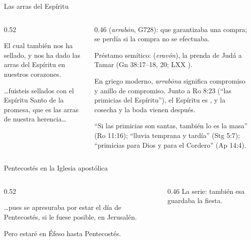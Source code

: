 \begin{frame}{Las arras del Espíritu}
\begin{columns}[c,onlytextwidth]
\begin{column}{0.52\textwidth}
\begin{cita}El cual también nos ha sellado, y nos ha dado las arras del Espíritu en nuestros corazones.\end{cita}
\begin{cita}\ldots{}fuisteis sellados con el Espíritu Santo de la promesa, que es las arras de nuestra herencia\ldots{}\end{cita}
\end{column}
\begin{column}{0.46\textwidth}\small\RaggedRight
{} (\emph{arrabōn}, G728):  que garantizaba una compra; se perdía si la compra no se efectuaba.\par\smallskip
Préstamo semítico:  (\emph{eravón}), la prenda de Judá a Tamar (Gn 38:17--18, 20; LXX ).\par\smallskip
En griego moderno, \emph{arrabōna} significa compromiso y anillo de compromiso. Junto a Ro 8:23 (``las primicias del Espíritu''), el Espíritu es , y la cosecha y la boda vienen después.\par\smallskip\scriptsize ``Si las primicias son santas, también lo es la masa'' (Ro 11:16); ``lluvia temprana y tardía'' (Stg 5:7); ``primicias para Dios y para el Cordero'' (Ap 14:4).
\end{column}
\end{columns}
\end{frame}

\begin{frame}{Pentecostés en la Iglesia apostólica}
\begin{columns}[c,onlytextwidth]
\begin{column}{0.52\textwidth}
\begin{cita}\ldots{}pues se apresuraba por estar el día de Pentecostés, si le fuese posible, en Jerusalén.\end{cita}
\begin{cita}Pero estaré en Éfeso hasta Pentecostés.\end{cita}
\end{column}
\begin{column}{0.46\textwidth}\small\RaggedRight
La serie: también esa  guardaba la fiesta.\par\medskip
{}
\end{column}
\end{columns}
\end{frame}

